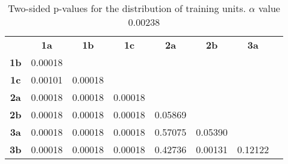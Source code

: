 \begin{table}[h!]
    \centering
    \begin{tabular}{cccccccc}
                & \textbf{1a}  & \textbf{1b}  & \textbf{1c}  & \textbf{2a}        & \textbf{2b}        & \textbf{3a}       \\
    \textbf{1b} & 0.00018 &         &         &         &         &         \\
    \textbf{1c} & 0.00101 & 0.00018 &         &         &         &         \\
    \textbf{2a} & 0.00018 & 0.00018 & 0.00018 &         &         &         \\
    \textbf{2b} & 0.00018 & 0.00018 & 0.00018 & 0.05869 &         &         \\
    \textbf{3a} & 0.00018 & 0.00018 & 0.00018 & 0.57075 & 0.05390 &         \\
    \textbf{3b} & 0.00018 & 0.00018 & 0.00018 & 0.42736 & 0.00131 & 0.12122
    \end{tabular}
    \caption[Experiment 2: p-table for training units]{Two-sided p-values for the distribution of training units. \(\alpha\) value 0.00238}
    \label{tab:exp2.trainingptable}
\end{table}